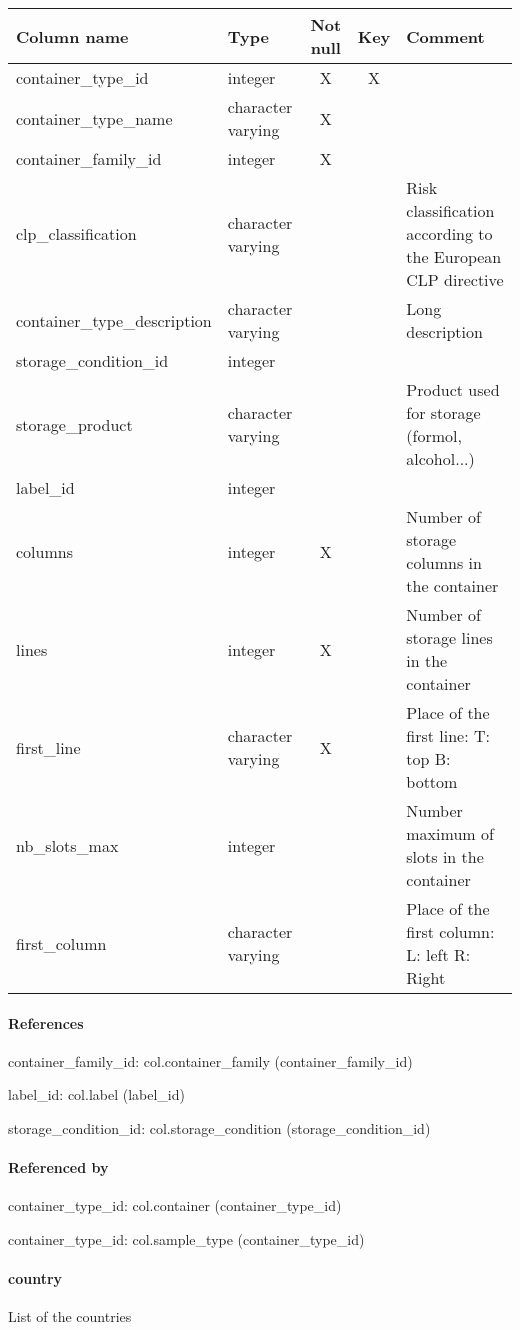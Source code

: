 \begin{tabular}{|l| p{2cm}|c|c| p{5cm}|}
\hline
Column name & Type & Not null & Key & Comment \\
\hline
container\_type\_id & integer & X & X & \\
container\_type\_name & character varying & X &  & \\
container\_family\_id & integer & X &  & \\
clp\_classification & character varying &  &  & Risk classification according to the European CLP directive\\
container\_type\_description & character varying &  &  & Long description\\
storage\_condition\_id & integer &  &  & \\
storage\_product & character varying &  &  & Product used for storage (formol, alcohol...)\\
label\_id & integer &  &  & \\
columns & integer & X &  & Number of storage columns in the container\\
lines & integer & X &  & Number of storage lines in the container\\
first\_line & character varying & X &  & Place of the first line:
T: top
B: bottom\\
nb\_slots\_max & integer &  &  & Number maximum of slots in the container\\
first\_column & character varying &  &  & Place of the first column: 
L: left
R: Right\\
\hline
\end{tabular}
\paragraph{References}
container\_family\_id: col.container\_family (container\_family\_id)

label\_id: col.label (label\_id)

storage\_condition\_id: col.storage\_condition (storage\_condition\_id)

\paragraph{Referenced by}
container\_type\_id: col.container (container\_type\_id)

container\_type\_id: col.sample\_type (container\_type\_id)

\paragraph{country}
List of the countries

